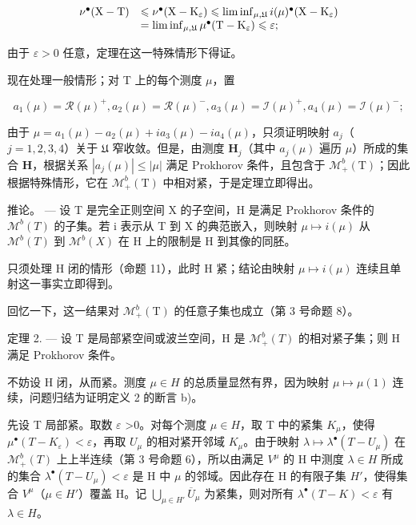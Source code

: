 \[
\begin{array}{r l} \nu^ {\bullet} (\mathrm{X} - \mathrm{T}) & \leqslant \nu^ {\bullet} (\mathrm{X} - \mathrm{K} _ {\varepsilon}) \leqslant \liminf _ {\mu , \mathfrak {U}} i (\mu) ^ {\bullet} (\mathrm{X} - \mathrm{K} _ {\varepsilon}) \\ & = \liminf _ {\mu , \mathfrak {U}} \mu^ {\bullet} (\mathrm{T} - \mathrm{K} _ {\varepsilon}) \leqslant \varepsilon ; \end{array}
\]

由于 \(\varepsilon > 0\) 任意，定理在这一特殊情形下得证。

现在处理一般情形；对 T 上的每个测度 \(\mu\)，置

\[
a _ {1} (\mu) = \mathcal {R} (\mu) ^ {+}, a _ {2} (\mu) = \mathcal {R} (\mu) ^ {-}, a _ {3} (\mu) = \mathcal {I} (\mu) ^ {+}, a _ {4} (\mu) = \mathcal {I} (\mu) ^ {-};
\]

由于 \(\mu = a_{1}(\mu) - a_{2}(\mu) + ia_{3}(\mu) - ia_{4}(\mu)\)，只须证明映射 \(a_{j}\)（\(j = 1,2,3,4\)）关于 \(\mathfrak{U}\) 窄收敛。但是，由测度 \(\mathbf{H}_j\)（其中 \(a_{j}(\mu)\) 遍历 \(\mu\)）所成的集合 \(\mathbf{H}\)，根据关系 \(|a_j(\mu)| \leqslant |\mu|\) 满足 Prokhorov 条件，且包含于 \(\mathcal{M}_+^b(\mathrm{T})\)；因此根据特殊情形，它在 \(\mathcal{M}_+^b(\mathrm{T})\) 中相对紧，于是定理立即得出。

推论。 --- 设 T 是完全正则空间 X 的子空间，H 是满足 Prokhorov 条件的 \(\mathcal{M}^{b}(T)\) 的子集。若 i 表示从 T 到 X 的典范嵌入，则映射 \(\mu\mapsto i(\mu)\) 从 \(\mathcal{M}^{b}(T)\) 到 \(\mathcal{M}^{b}(X)\) 在 H 上的限制是 H 到其像的同胚。

只须处理 H 闭的情形（命题 11），此时 H 紧；结论由映射 \(\mu \mapsto i(\mu)\) 连续且单射这一事实立即得到。

回忆一下，这一结果对 \(\mathcal{M}_{+}^{b}(\mathrm{T})\) 的任意子集也成立（第 3 号命题 8）。

定理 2. --- 设 T 是局部紧空间或波兰空间，H 是 \(\mathcal{M}_{+}^{b}(T)\) 的相对紧子集；则 H 满足 Prokhorov 条件。

不妨设 H 闭，从而紧。测度 \(\mu \in H\) 的总质量显然有界，因为映射 \(\mu \mapsto \mu(1)\) 连续，问题归结为证明定义 2 的断言 b)。

先设 T 局部紧。取数 \(\varepsilon\) \textgreater0。对每个测度 \(\mu\in H\)，取 T 中的紧集 \(K_{\mu}\)，使得 \(\mu^{\bullet}(T-K_{\varepsilon})<\varepsilon\)，再取 \(U_{\mu}\) 的相对紧开邻域 \(K_{\mu}\)。由于映射 \(\lambda\mapsto\lambda^{\bullet}(T-U_{\mu})\) 在 \(\mathcal{M}_{+}^{b}(T)\) 上上半连续（第 3 号命题 6），所以由满足 \(V^{\mu}\) 的 H 中测度 \(\lambda\in H\) 所成的集合 \(\lambda^{\bullet}(T-U_{\mu})<\varepsilon\) 是 H 中 \(\mu\) 的邻域。因此存在 H 的有限子集 \(H'\)，使得集合 \(V^{\mu}\)（\(\mu\in H'\)）覆盖 H。记 \(\bigcup_{\mu\in H'}\overline{U}_{\mu}\) 为紧集，则对所有 \(\lambda^{\bullet}(T-K)<\varepsilon\) 有 \(\lambda\in H\)。

